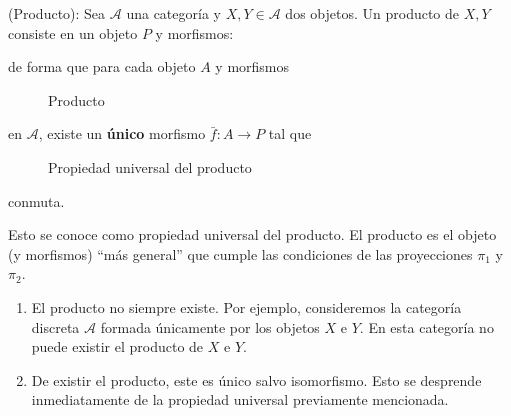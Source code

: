 \begin{definicion}
    (Producto): Sea $\mathscr{A}$ una categoría y $X,Y \in \mathscr{A}$ dos objetos. Un producto de $X,Y$ consiste en un objeto $P$ y morfismos:

    \begin{center}
    \end{center}
    de forma que para cada objeto $A$ y morfismos


    \begin{figure}[htpb]
        \centering
        \caption{Producto}
        \label{diag:producto}
    \end{figure}
        
    en $\mathscr{A}$, existe un \textbf{único} morfismo $\bar{f}: A \longrightarrow P$ tal que 

    \begin{figure}[htpb]
        \centering
        \caption{Propiedad universal del producto}
        \label{diag:universal-producto}
    \end{figure}
    conmuta. 
    
    Esto se conoce como propiedad universal del producto. El producto es el objeto (y morfismos) ``más general'' que cumple las condiciones de las proyecciones $\pi_{1}$ y $\pi_{2}$.
    
\end{definicion}

\begin{observacion}
    \begin{enumerate}
        \item  El producto no siempre existe. Por ejemplo, consideremos la categoría discreta $\mathscr{A}$ formada únicamente por los objetos $X$ e $Y$. En esta categoría no puede existir el producto de $X$ e $Y$.
        \item De existir el producto, este es único salvo isomorfismo. Esto se desprende inmediatamente de la propiedad universal previamente mencionada.
    \end{enumerate}
\end{observacion}

